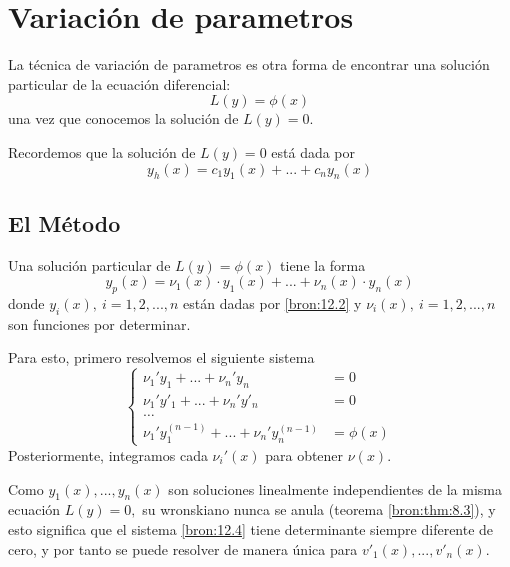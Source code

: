  \section{Variaci\'on de parametros}


La t\'ecnica de variaci\'on de parametros es otra forma de encontrar una soluci\'on particular de la ecuaci\'on diferencial:
\begin{equation}
	\label{bron:12.1}
	L(y)=\phi(x)
\end{equation}
una vez que conocemos la soluci\'on de $L(y)=0.$



Recordemos que la soluci\'on de $L(y)=0$ está dada por
\begin{equation}
	\label{bron:12.2}
	y_{h}(x)=c_{1}y_{1}(x)+...+c_{n}y_{n}(x)
\end{equation}



\subsection{El M\'etodo}


Una soluci\'on particular de $L(y)=\phi(x)$ tiene la forma
\begin{equation}
	\label{bron:12.3}
	y_{p}(x)=\nu_{1}(x)\cdot y_{1}(x)+...+\nu_{n}(x) \cdot y_{n}(x)
\end{equation}
donde $y_{i}(x), \ i=1,2,...,n$ están dadas por \eqref{bron:12.2} y $\nu_{i}(x), \ i=1,2,...,n$ son funciones por determinar.



Para esto, primero resolvemos el siguiente sistema
\begin{equation}
	\label{bron:12.4}
	\begin{cases}
		\nu_{1}'y_{1}+...+\nu_{n}'y_{n}&=0\\
		\nu_{1}'y'_{1}+...+\nu_{n}'y'_{n}&=0\\
		\ldots & \\
		\nu_{1}'y^{(n-1)}_{1}+...+\nu_{n}'y^{(n-1)}_{n}&=\phi(x)
	\end{cases}
\end{equation}
Posteriormente, integramos cada $\nu_{i}'(x)$ para obtener $\nu(x).$



Como $y_{1}(x),...,y_{n}(x)$ son soluciones linealmente independientes de la misma ecuaci\'on $L(y)=0,$ su wronskiano nunca se anula (teorema \ref{bron:thm:8.3}), y esto significa que el sistema \eqref{bron:12.4} tiene determinante siempre diferente de cero, y por tanto se puede resolver de manera única para $v'_{1}(x),...,v'_{n}(x).$



